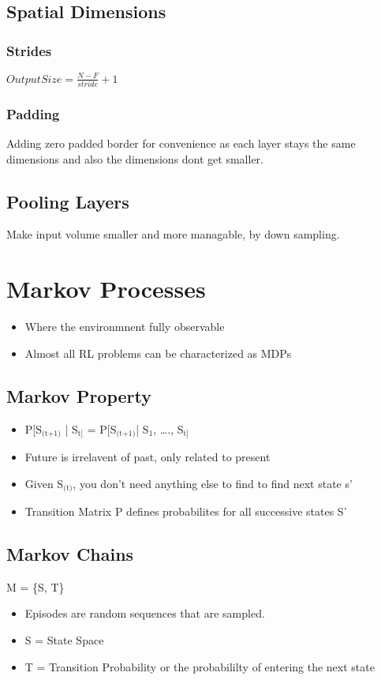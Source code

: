 \documentclass[11pt]{article}
\begin{document}
\subsection{Spatial Dimensions}
\label{sec-2-2}
\subsubsection{Strides}
\label{sec-2-2-1}
$Output Size = \frac{N-F}{stride} + 1$
\subsubsection{Padding}
\label{sec-2-2-2}
Adding zero padded border for convenience as each layer stays the same dimensions and also the dimensions dont get smaller.
\subsection{Pooling Layers}
\label{sec-2-3}
Make input volume smaller and more managable, by down sampling.

\section{Markov Processes}
\label{sec-3}
\begin{itemize}
\item Where the environmnent fully observable
\item Almost all RL problems can be characterized as MDPs
\end{itemize}
\subsection{Markov Property}
\label{sec-3-1}
\begin{itemize}
\item P[S$_{\text{(t+1)}}$ | S$_{\text{t]}}$ = P[S$_{\text{(t+1)}}$| S$_{\text{1}}$, \ldots{}., S$_{\text{t]}}$
\item Future is irrelavent of past, only related to present
\item Given S$_{\text{(t)}}$, you don't need anything else to find to find next state s'
\item Transition Matrix P defines probabilites for all successive states S'
\end{itemize}
\subsection{Markov Chains}
\label{sec-3-2}
M = \{S, T\}
\begin{itemize}
\item Episodes are random sequences that are sampled.
\item S = State Space
\item T = Transition Probability or the probabililty of entering the next state
\end{itemize}
\end{document}
